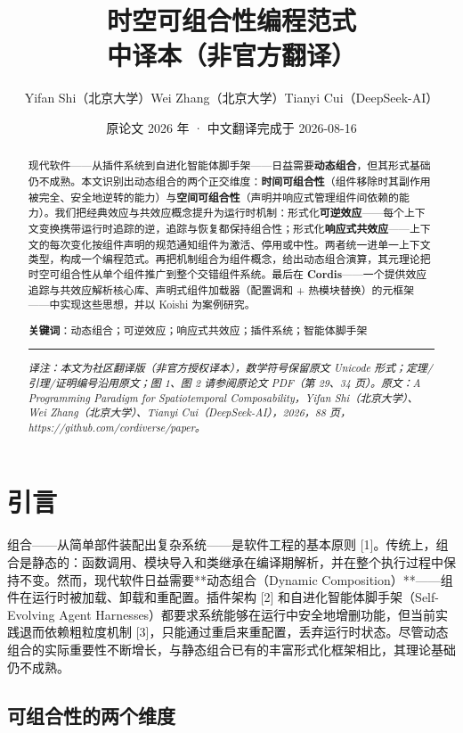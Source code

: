 \documentclass[11pt,a4paper]{article}
\title{时空可组合性编程范式\\[0.3em]{\large 中译本（非官方翻译）}}
\author{Yifan Shi（北京大学）\quad Wei Zhang（北京大学）\quad Tianyi Cui（DeepSeek-AI）}
\date{原论文 2026 年 · 中文翻译完成于 2026-08-16}
\theoremstyle{plain}
\theoremstyle{definition}
\theoremstyle{remark}
\begin{document}
\maketitle
\tableofcontents
\newpage
\begin{abstract}
现代软件——从插件系统到自进化智能体脚手架——日益需要\textbf{动态组合}，但其形式基础仍不成熟。本文识别出动态组合的两个正交维度：\textbf{时间可组合性}（组件移除时其副作用被完全、安全地逆转的能力）与\textbf{空间可组合性}（声明并响应式管理组件间依赖的能力）。我们把经典效应与共效应概念提升为运行时机制：形式化\textbf{可逆效应}——每个上下文变换携带运行时追踪的逆，追踪与恢复都保持组合性；形式化\textbf{响应式共效应}——上下文的每次变化按组件声明的规范通知组件为激活、停用或中性。两者统一进单一上下文类型，构成一个编程范式。再把机制组合为组件概念，给出动态组合演算，其元理论把时空可组合性从单个组件推广到整个交错组件系统。最后在 \textbf{Cordis}——一个提供效应追踪与共效应解析核心库、声明式组件加载器（配置调和 + 热模块替换）的元框架——中实现这些思想，并以 Koishi 为案例研究。

\textbf{关键词}：动态组合；可逆效应；响应式共效应；插件系统；智能体脚手架

\noindent\rule{\textwidth}{0.4pt}

\textit{译注：本文为社区翻译版（非官方授权译本），数学符号保留原文 Unicode 形式；定理/引理/证明编号沿用原文；图 1、图 2 请参阅原论文 PDF（第 29、34 页）。原文：A Programming Paradigm for Spatiotemporal Composability，Yifan Shi（北京大学）、Wei Zhang（北京大学）、Tianyi Cui（DeepSeek-AI），2026，88 页，https://github.com/cordiverse/paper。}
\end{abstract}
\section{引言}

组合——从简单部件装配出复杂系统——是软件工程的基本原则 [1]。传统上，组合是静态的：函数调用、模块导入和类继承在编译期解析，并在整个执行过程中保持不变。然而，现代软件日益需要**动态组合（Dynamic Composition）**——组件在运行时被加载、卸载和重配置。插件架构 [2] 和自进化智能体脚手架（Self-Evolving Agent Harnesses）都要求系统能够在运行中安全地增删功能，但当前实践退而依赖粗粒度机制 [3]，只能通过重启来重配置，丢弃运行时状态。尽管动态组合的实际重要性不断增长，与静态组合已有的丰富形式化框架相比，其理论基础仍不成熟。

\subsection{可组合性的两个维度}
\end{document}
